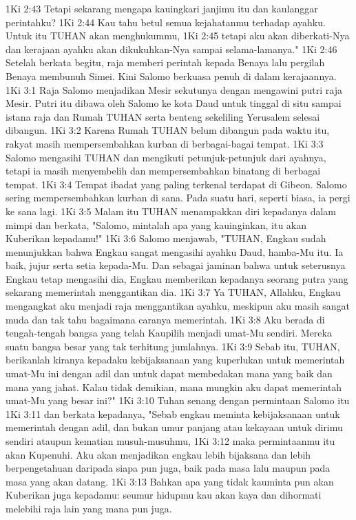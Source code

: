 1Ki 2:43  Tetapi sekarang mengapa kauingkari janjimu itu dan kaulanggar perintahku?
1Ki 2:44  Kau tahu betul semua kejahatanmu terhadap ayahku. Untuk itu TUHAN akan menghukummu,
1Ki 2:45  tetapi aku akan diberkati-Nya dan kerajaan ayahku akan dikukuhkan-Nya sampai selama-lamanya."
1Ki 2:46  Setelah berkata begitu, raja memberi perintah kepada Benaya lalu pergilah Benaya membunuh Simei. Kini Salomo berkuasa penuh di dalam kerajaannya.
1Ki 3:1  Raja Salomo menjadikan Mesir sekutunya dengan mengawini putri raja Mesir. Putri itu dibawa oleh Salomo ke kota Daud untuk tinggal di situ sampai istana raja dan Rumah TUHAN serta benteng sekeliling Yerusalem selesai dibangun.
1Ki 3:2  Karena Rumah TUHAN belum dibangun pada waktu itu, rakyat masih mempersembahkan kurban di berbagai-bagai tempat.
1Ki 3:3  Salomo mengasihi TUHAN dan mengikuti petunjuk-petunjuk dari ayahnya, tetapi ia masih menyembelih dan mempersembahkan binatang di berbagai tempat.
1Ki 3:4  Tempat ibadat yang paling terkenal terdapat di Gibeon. Salomo sering mempersembahkan kurban di sana. Pada suatu hari, seperti biasa, ia pergi ke sana lagi.
1Ki 3:5  Malam itu TUHAN menampakkan diri kepadanya dalam mimpi dan berkata, "Salomo, mintalah apa yang kauinginkan, itu akan Kuberikan kepadamu!"
1Ki 3:6  Salomo menjawab, "TUHAN, Engkau sudah menunjukkan bahwa Engkau sangat mengasihi ayahku Daud, hamba-Mu itu. Ia baik, jujur serta setia kepada-Mu. Dan sebagai jaminan bahwa untuk seterusnya Engkau tetap mengasihi dia, Engkau memberikan kepadanya seorang putra yang sekarang memerintah menggantikan dia.
1Ki 3:7  Ya TUHAN, Allahku, Engkau mengangkat aku menjadi raja menggantikan ayahku, meskipun aku masih sangat muda dan tak tahu bagaimana caranya memerintah.
1Ki 3:8  Aku berada di tengah-tengah bangsa yang telah Kaupilih menjadi umat-Mu sendiri. Mereka suatu bangsa besar yang tak terhitung jumlahnya.
1Ki 3:9  Sebab itu, TUHAN, berikanlah kiranya kepadaku kebijaksanaan yang kuperlukan untuk memerintah umat-Mu ini dengan adil dan untuk dapat membedakan mana yang baik dan mana yang jahat. Kalau tidak demikian, mana mungkin aku dapat memerintah umat-Mu yang besar ini?"
1Ki 3:10  Tuhan senang dengan permintaan Salomo itu
1Ki 3:11  dan berkata kepadanya, "Sebab engkau meminta kebijaksanaan untuk memerintah dengan adil, dan bukan umur panjang atau kekayaan untuk dirimu sendiri ataupun kematian musuh-musuhmu,
1Ki 3:12  maka permintaanmu itu akan Kupenuhi. Aku akan menjadikan engkau lebih bijaksana dan lebih berpengetahuan daripada siapa pun juga, baik pada masa lalu maupun pada masa yang akan datang.
1Ki 3:13  Bahkan apa yang tidak kauminta pun akan Kuberikan juga kepadamu: seumur hidupmu kau akan kaya dan dihormati melebihi raja lain yang mana pun juga.
